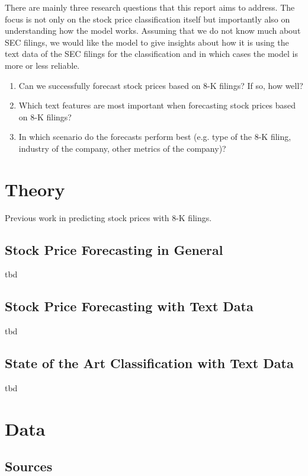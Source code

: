 \documentclass{article}
\begin{document}
	There are mainly three research questions that this report aims to address. The focus is not only on the stock price classification itself but importantly also on understanding how the model works. Assuming that we do not know much about SEC filings, we would like the model to give insights about how it is using the text data of the SEC filings for the classification and in which cases the model is more or less reliable. 
	
	\begin{enumerate}
		\item Can we successfully forecast stock prices based on 8-K filings? If so, how well?
		\item Which text features are most important when forecasting stock prices based on 8-K filings?
		\item In which scenario do the forecasts perform best (e.g. type of the 8-K filing, industry of the company, other metrics of the company)?
	\end{enumerate}
	

	\section{Theory}
	
	Previous work in predicting stock prices with 8-K filings.
	
	\subsection{Stock Price Forecasting in General}
	tbd 
	
	\subsection{Stock Price Forecasting with Text Data}
	tbd
	
	\subsection{State of the Art Classification with Text Data}
	tbd

	\section{Data}
	
	\subsection{Sources}
	
\end{document}
